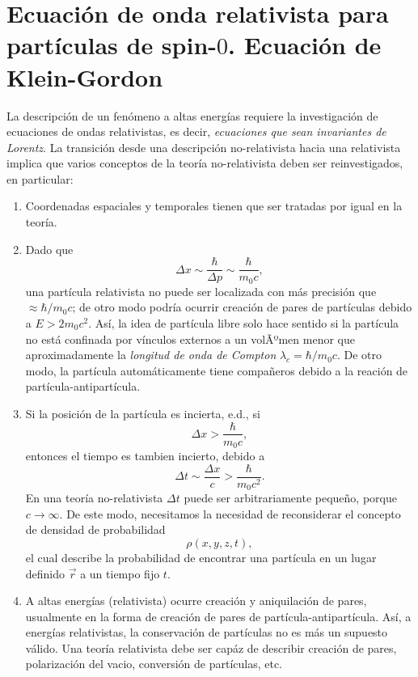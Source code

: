 \section{Ecuación de onda relativista para partículas de spin-$0$. Ecuación de Klein-Gordon}

La descripción de un fenómeno a altas energías requiere la investigación de ecuaciones de ondas relativistas, es decir, \textit{ecuaciones que sean invariantes de Lorentz}. La transición desde una descripción no-relativista hacia una relativista implica que varios conceptos de la teoría no-relativista deben ser reinvestigados, en particular:
\begin{enumerate}
	\item Coordenadas espaciales y temporales tienen que ser tratadas por igual en la teoría.
	\item Dado que
	\begin{equation}
  \Delta x\sim \frac{\hbar}{\Delta p}\sim \frac{\hbar }{m_0c},
\end{equation}
una partícula relativista no puede ser localizada con más precisión que $\approx \hbar/m_0c$; de otro modo podría ocurrir creación de pares de partículas debido a $E>2m_0c^2$. Así, la idea de partícula libre solo hace sentido si la partícula no está confinada por vínculos externos a un volÃºmen menor que aproximadamente la \textit{longitud de onda de Compton} $\lambda_{ c}=\hbar/m_0c $. De otro modo, la partícula automáticamente tiene compañeros debido a la reación de partícula-antipartícula.
\item Si la posición de la partícula es incierta, e.d., si
\begin{equation}
  \Delta x>\frac{\hbar }{m_0c},
\end{equation}
entonces el tiempo es tambien incierto, debido a
\begin{equation}
  \Delta t\sim \frac{\Delta x}{c}>\frac{\hbar}{m_0c^2}.
\end{equation}
En una teoría no-relativista $\Delta t$ puede ser arbitrariamente pequeño, porque $c\to \infty$. De este modo, necesitamos la necesidad de reconsiderar el concepto de densidad de probabilidad
\begin{equation}
  \rho(x,y,z,t),
\end{equation}
el cual describe la probabilidad de encontrar una partícula en un lugar definido $\vec{r}$ a un tiempo fijo $t$.
\item A altas energías (relativista) ocurre creación y aniquilación de pares, usualmente en la forma de creación de pares de partícula-antipartícula. Así, a energías relativistas, la conservación de partículas no es más un supuesto válido. Una teoría relativista debe ser capáz de describir creación de pares, polarización del vacio, conversión de partículas, etc. 
\end{enumerate}

